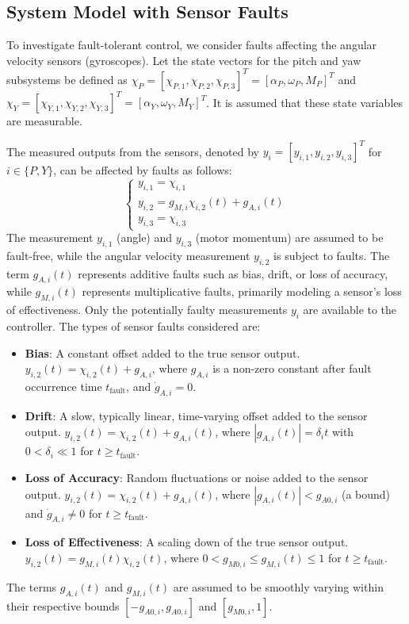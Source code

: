 \subsection{System Model with Sensor Faults}
To investigate fault-tolerant control, we consider faults affecting the angular velocity sensors (gyroscopes). Let the state vectors for the pitch and yaw subsystems be defined as $\chi_P = [\chi_{P,1}, \chi_{P,2}, \chi_{P,3}]^T = [\alpha_P, \omega_P, M_{P}]^T$ and $\chi_Y = [\chi_{Y,1}, \chi_{Y,2}, \chi_{Y,3}]^T = [\alpha_Y, \omega_Y, M_{Y}]^T$. It is assumed that these state variables are measurable.

The measured outputs from the sensors, denoted by $y_i = [y_{i,1}, y_{i,2}, y_{i,3}]^T$ for $i \in \{P, Y\}$, can be affected by faults as follows:
\begin{equation}
    \label{eq:sensor_fault_model}
    \begin{cases}
        y_{i,1} = \chi_{i,1} \\
        y_{i,2} = g_{M,i} \chi_{i,2}(t) + g_{A,i}(t) \\
        y_{i,3} = \chi_{i,3}
    \end{cases}
\end{equation}
The measurement $y_{i,1}$ (angle) and $y_{i,3}$ (motor momentum) are assumed to be fault-free, while the angular velocity measurement $y_{i,2}$ is subject to faults. The term $g_{A,i}(t)$ represents additive faults such as bias, drift, or loss of accuracy, while $g_{M,i}(t)$ represents multiplicative faults, primarily modeling a sensor's loss of effectiveness.
Only the potentially faulty measurements $y_i$ are available to the controller. The types of sensor faults considered are:
\begin{itemize}
    \item \textbf{Bias}: A constant offset added to the true sensor output.
    $y_{i,2}(t) = \chi_{i,2}(t) + g_{A,i}$, where $g_{A,i}$ is a non-zero constant after fault occurrence time $t_{\text{fault}}$, and $\dot{g}_{A,i} = 0$.
    \item \textbf{Drift}: A slow, typically linear, time-varying offset added to the sensor output.
    $y_{i,2}(t) = \chi_{i,2}(t) + g_{A,i}(t)$, where $|g_{A,i}(t)| = \delta_i t$ with $0 < \delta_i \ll 1$ for $t \ge t_{\text{fault}}$.
    \item \textbf{Loss of Accuracy}: Random fluctuations or noise added to the sensor output.
    $y_{i,2}(t) = \chi_{i,2}(t) + g_{A,i}(t)$, where $|g_{A,i}(t)| < g_{A0,i}$ (a bound) and $\dot{g}_{A,i} \neq 0$ for $t \ge t_{\text{fault}}$.
    \item \textbf{Loss of Effectiveness}: A scaling down of the true sensor output.
    $y_{i,2}(t) = g_{M,i}(t) \chi_{i,2}(t)$, where $0 < g_{M0,i} \le g_{M,i}(t) \le 1$ for $t \ge t_{\text{fault}}$.
\end{itemize}
The terms $g_{A,i}(t)$ and $g_{M,i}(t)$ are assumed to be smoothly varying within their respective bounds $[ -g_{A0,i}, g_{A0,i} ]$ and $[ g_{M0,i}, 1 ]$.

